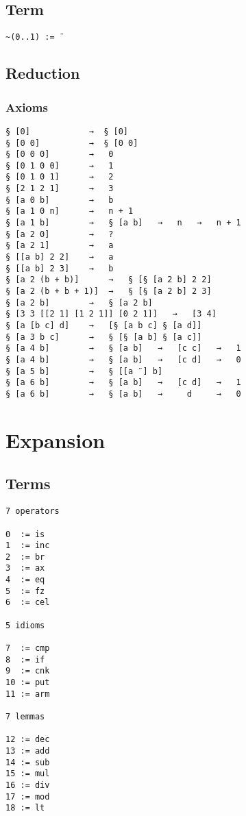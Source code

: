 \documentclass[twoside]{article}
\begin{document}
\subsection*{Term}

\begin{lstlisting}[style=listingcode,numbers=none]
~(0..1) := ¨
\end{lstlisting}

\newpage

\subsection*{Reduction}

\subsubsection*{Axioms}

\begin{lstlisting}[style=listingcode]
§ [0]            →  § [0]
§ [0 0]          →  § [0 0]
§ [0 0 0]        →   0
§ [0 1 0 0]      →   1
§ [0 1 0 1]      →   2
§ [2 1 2 1]      →   3
§ [a 0 b]        →   b
§ [a 1 0 n]      →   n + 1
§ [a 1 b]        →   § [a b]   →   n   →   n + 1
§ [a 2 0]        →   ?
§ [a 2 1]        →   a
§ [[a b] 2 2]    →   a
§ [[a b] 2 3]    →   b
§ [a 2 (b + b)]      →   § [§ [a 2 b] 2 2]
§ [a 2 (b + b + 1)]  →   § [§ [a 2 b] 2 3]
§ [a 2 b]        →   § [a 2 b]
§ [3 3 [[2 1] [1 2 1]] [0 2 1]]   →   [3 4]
§ [a [b c] d]    →   [§ [a b c] § [a d]]
§ [a 3 b c]      →   § [§ [a b] § [a c]]
§ [a 4 b]        →   § [a b]   →   [c c]   →   1
§ [a 4 b]        →   § [a b]   →   [c d]   →   0
§ [a 5 b]        →   § [[a ¨] b]
§ [a 6 b]        →   § [a b]   →   [c d]   →   1
§ [a 6 b]        →   § [a b]   →     d     →   0
\end{lstlisting}

\newpage

\section*{Expansion}

\subsection*{Terms}

\begin{lstlisting}[style=listingcode]
7 operators

0  := is
1  := inc
2  := br
3  := ax
4  := eq
5  := fz
6  := cel

5 idioms

7  := cmp
8  := if
9  := cnk
10 := put
11 := arm

7 lemmas

12 := dec
13 := add
14 := sub
15 := mul
16 := div
17 := mod
18 := lt
\end{lstlisting}
\end{document}
